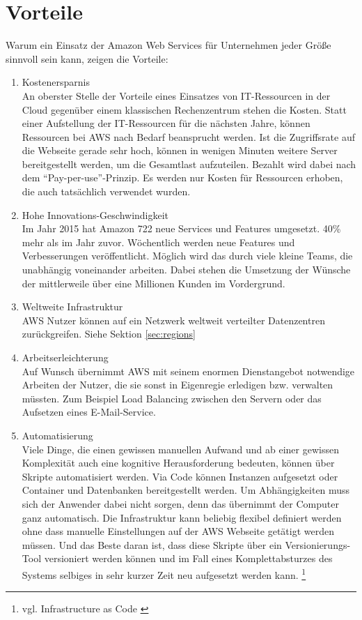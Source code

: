 \section{Vorteile}
\label{sec:vorteile}
Warum ein Einsatz der Amazon Web Services für Unternehmen jeder Größe sinnvoll sein kann, zeigen die Vorteile:
\begin{enumerate}
  \item Kostenersparnis
  \\ An oberster Stelle der Vorteile eines Einsatzes von IT-Ressourcen in der Cloud gegenüber einem klassischen Rechenzentrum stehen die Kosten. Statt einer Aufstellung der IT-Ressourcen für die nächsten Jahre, können Ressourcen bei AWS nach Bedarf beansprucht werden. Ist die Zugriffsrate auf die Webseite gerade sehr hoch, können in wenigen Minuten weitere Server bereitgestellt werden, um die Gesamtlast aufzuteilen. Bezahlt wird dabei nach dem "`Pay-per-use"'-Prinzip. Es werden nur Kosten für Ressourcen erhoben, die auch tatsächlich verwendet wurden.
  \item Hohe Innovations-Geschwindigkeit
  \\ Im Jahr 2015 hat Amazon 722 neue Services und Features umgesetzt. 40\% mehr als im Jahr zuvor. Wöchentlich werden neue Features und Verbesserungen veröffentlicht. Möglich wird das durch viele kleine Teams, die unabhängig voneinander arbeiten. Dabei stehen die Umsetzung der Wünsche der mittlerweile über eine Millionen Kunden im Vordergrund.
  \item Weltweite Infrastruktur
  \\ AWS Nutzer können auf ein Netzwerk weltweit verteilter Datenzentren zurückgreifen. Siehe Sektion \ref{sec:regions}
  \item Arbeitserleichterung
  \\ Auf Wunsch übernimmt AWS mit seinem enormen Dienstangebot notwendige Arbeiten der Nutzer, die sie sonst in Eigenregie erledigen bzw. verwalten müssten. Zum Beispiel Load Balancing zwischen den Servern oder das Aufsetzen eines E-Mail-Service.
  \item Automatisierung
  \\ Viele Dinge, die einen gewissen manuellen Aufwand und ab einer gewissen Komplexität auch eine kognitive Herausforderung bedeuten, können über Skripte automatisiert werden. Via Code können Instanzen aufgesetzt oder Container und Datenbanken bereitgestellt werden. Um Abhängigkeiten muss sich der Anwender dabei nicht sorgen, denn das übernimmt der Computer ganz automatisch. Die Infrastruktur kann beliebig flexibel definiert werden ohne dass manuelle Einstellungen auf der AWS Webseite getätigt werden müssen. Und das Beste daran ist, dass diese Skripte über ein Versionierungs-Tool versioniert werden können und im Fall eines Komplettabsturzes des Systems selbiges in sehr kurzer Zeit neu aufgesetzt werden kann. \footnote{vgl. Infrastructure as Code \cite{wittig:awsinaction}}

\end{enumerate}
